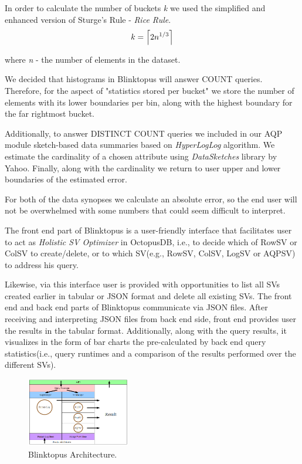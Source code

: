 \documentclass[10pt, conference, compsocconf]{IEEEtran}
\DeclarePairedDelimiter\ceil{\lceil}{\rceil}
\begin{document}
In order to calculate the number of buckets \textit{k} we used the simplified and enhanced version of Sturge's Rule - \textit{Rice Rule}.
\begin{equation}
k=\ceil*{2n^{1/3}}
\end{equation}

where \textit{n} - the number of elements in the dataset.
 
We decided that histograms in Blinktopus will answer COUNT queries. Therefore, for the aspect of "statistics stored per bucket" we store the number of elements with its lower boundaries per bin, along with the highest boundary for the far rightmost bucket.

Additionally, to answer DISTINCT COUNT queries we included in our AQP module sketch-based data summaries based on \textit{HyperLogLog} algorithm.  We estimate the cardinality of a chosen attribute using \textit{DataSketches} library by Yahoo. Finally, along with the cardinality we return to user upper and lower boundaries of the estimated error.

For both of the data synopses we calculate an absolute error, so the end user will not be overwhelmed with some numbers that could seem difficult to interpret.

The front end part of Blinktopus is a user-friendly interface that facilitates user to act as \textit{Holistic SV Optimizer} in OctopusDB, i.e., to decide which of RowSV or ColSV to create/delete, or to which SV(e.g., RowSV, ColSV, LogSV or AQPSV) to address his query. 

Likewise, via this interface user is provided with opportunities to list all SVs created earlier in tabular or JSON format and delete all existing SVs.
The front end and back end parts of Blinktopus communicate via JSON files. After receiving and interpreting JSON files from back end side, front end provides user the results in the tabular format. Additionally, along with the query results, it visualizes in the form of bar charts the pre-calculated by back end query statistics(i.e., query runtimes and a comparison of the results performed over the different SVs).

\begin{figure} \includegraphics[width=0.4\textwidth, center]{img/blinktopus_architecture.png} 
\caption{Blinktopus Architecture.}
\end{figure}
\end{document}
